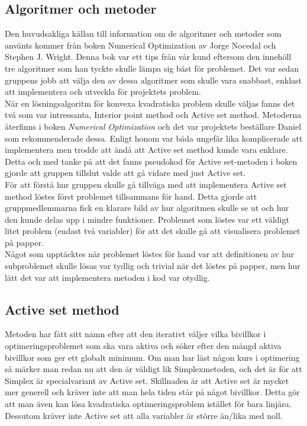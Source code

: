 \subsection{Algoritmer och metoder}
Den huvudsakliga källan till information om de algoritmer och metoder som använts kommer från boken Numerical Optimization av Jorge Nocedal och Stephen J. Wright. Denna bok var ett tips från vår kund eftersom den innehöll tre algoritmer som han tyckte skulle lämpa sig bäst för problemet. Det var sedan gruppens jobb att välja den av dessa algoritmer som skulle vara snabbast, enklast att implementera och utveckla för projektets problem.
\\
När en lösningsalgoritm för konvexa kvadratiska problem skulle väljas fanns det två som var intressanta, Interior point method och Active set method. Metoderna återfinns i boken \emph{Numerical Optimization} och det var projektets beställare Daniel som rekommenderade dessa. Enligt honom var båda ungefär lika komplicerade att implementera men trodde att ändå att Active set method kunde vara enklare. Detta och med tanke på att det fanns pseudokod för Active set-metoden i boken gjorde att gruppen tillslut valde att gå vidare med just Active set. 
\\
För att förstå hur gruppen skulle gå tillväga med att implementera Active set method löstes först problemet tillsammans för hand. Detta gjorde att gruppmedlemmarna fick en klarare bild av hur algoritmen skulle se ut och hur den kunde delas upp i mindre funktioner. Problemet som löstes var ett väldigt litet problem (endast två variabler) för att det skulle gå att visualisera problemet på papper. \\
Något som upptäcktes när problemet löstes för hand var att definitionen av hur subproblemet skulle lösas var tydlig och trivial när det löstes på papper, men hur lätt det var att implementera metoden i kod var otydlig. 

\subsection{Active set method}   
Metoden har fått sitt namn efter att den iterativt väljer vilka bivillkor i optimeringsproblemet som ska vara aktiva och söker efter den mängd aktiva bivillkor som ger ett globalt minimum. Om man har läst någon kurs i optimering så märker man redan nu att den är väldigt lik Simplexmetoden, och det är för att Simplex är specialvariant av Active set. Skillnaden är att Active set är mycket mer generell och kräver inte att man hela tiden står på något bivillkor. Detta gör att man även kan lösa kvadratiska optimeringsproblem istället för bara linjära. Dessutom kräver inte Active set att alla variabler är större än/lika med noll.

